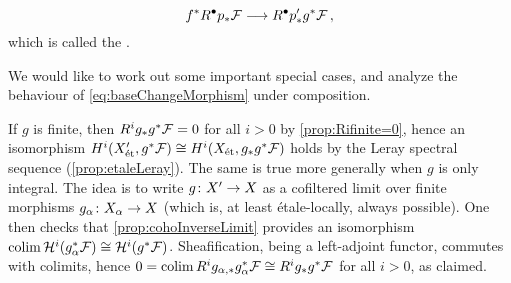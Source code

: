 \documentclass[a4paper, 10pt, oneside, DIV=9, chapterprefix=true, numbers=enddot, bibliography=totoc]{scrbook}
\begin{document}
\begin{equation}\label{eq:baseChangeMorphism}
	f^*R^\bullet p_*\Ff\morphism R^\bullet p'_*g^*\Ff\,,
\end{equation}
which is called the .
\begin{rem}\label{rem:baseChangeSpecialCases}
	We would like to work out some important special cases, and analyze the behaviour of \cref{eq:baseChangeMorphism} under composition.
	\begin{alphanumerate}
		\item If $g$ is finite, then $R^ig_*g^*\mathcal{F}=0$ for all $i>0$ by \cref{prop:Rifinite=0}, hence an isomorphism $H^i(X'_{\mathrm{\acute{e}t}},g^*\mathcal{F})\cong H^i(X_{\mathrm{\acute{e}t}},g_*g^*\mathcal{F})$ holds by the Leray spectral sequence (\cref{prop:etaleLeray}). The same is true more generally when $g$ is only integral. The idea is to write $g\colon X'\morphism X$ as a cofiltered limit over finite morphisms $g_\alpha\colon X_\alpha\morphism X$ (which is, at least étale-locally, always possible). One then checks that \cref{prop:cohoInverseLimit} provides an isomorphism $\operatorname*{colim} \mathcal{H}^i(g_\alpha^*\mathcal{F})\cong \mathcal{H}^i(g^*\mathcal{F})$. Sheafification, being a left-adjoint functor, commutes with colimits, hence $0=\operatorname*{colim} R^ig_{\alpha,*}g_\alpha^*\mathcal{F}\cong R^ig_*g^*\mathcal{F}$ for all $i>0$, as claimed.
		

\end{alphanumerate}
\end{rem}
\end{document}

